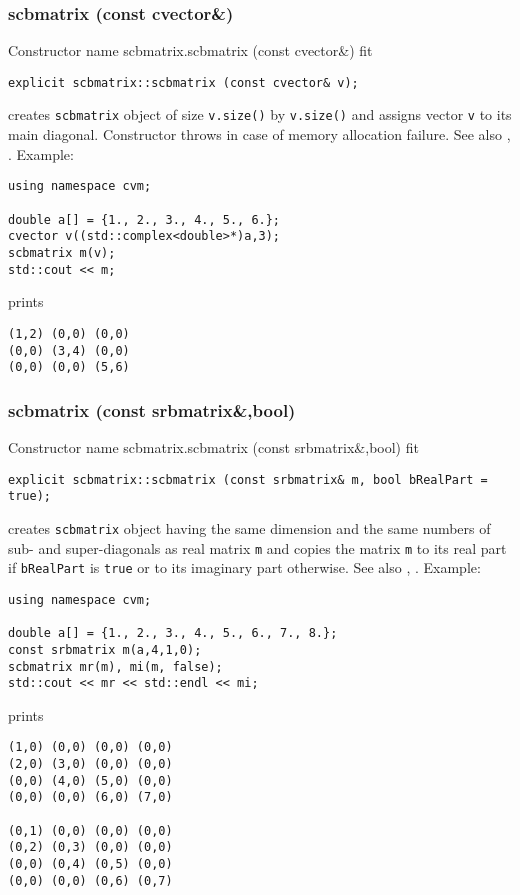 \subsubsection{scbmatrix (const cvector\&)}
Constructor%
\pdfdest name {scbmatrix.scbmatrix (const cvector&)} fit
\begin{verbatim}
explicit scbmatrix::scbmatrix (const cvector& v);
\end{verbatim}
creates  \verb"scbmatrix" object
of size \verb"v.size()" by \verb"v.size()"
and assigns vector \verb"v" to its main diagonal.
Constructor throws  
in case of memory allocation failure.
See also , .
Example:
\begin{Verbatim}
using namespace cvm;

double a[] = {1., 2., 3., 4., 5., 6.};
cvector v((std::complex<double>*)a,3);
scbmatrix m(v);
std::cout << m;
\end{Verbatim}
prints
\begin{Verbatim}
(1,2) (0,0) (0,0)
(0,0) (3,4) (0,0)
(0,0) (0,0) (5,6)
\end{Verbatim}
\newpage



\subsubsection{scbmatrix (const srbmatrix\&,bool)}
Constructor%
\pdfdest name {scbmatrix.scbmatrix (const srbmatrix&,bool)} fit
\begin{verbatim}
explicit scbmatrix::scbmatrix (const srbmatrix& m, bool bRealPart = true);
\end{verbatim}
creates  \verb"scbmatrix" object
having the same dimension and the same numbers
of sub- and super-diagonals as real matrix \verb"m"
and copies the matrix \verb"m" to its real part if
\verb"bRealPart" is \verb"true" or
to its imaginary part otherwise.
See also , .
Example:
\begin{Verbatim}
using namespace cvm;

double a[] = {1., 2., 3., 4., 5., 6., 7., 8.};
const srbmatrix m(a,4,1,0);
scbmatrix mr(m), mi(m, false);
std::cout << mr << std::endl << mi;
\end{Verbatim}
prints
\begin{Verbatim}
(1,0) (0,0) (0,0) (0,0)
(2,0) (3,0) (0,0) (0,0)
(0,0) (4,0) (5,0) (0,0)
(0,0) (0,0) (6,0) (7,0)

(0,1) (0,0) (0,0) (0,0)
(0,2) (0,3) (0,0) (0,0)
(0,0) (0,4) (0,5) (0,0)
(0,0) (0,0) (0,6) (0,7)
\end{Verbatim}
\newpage




